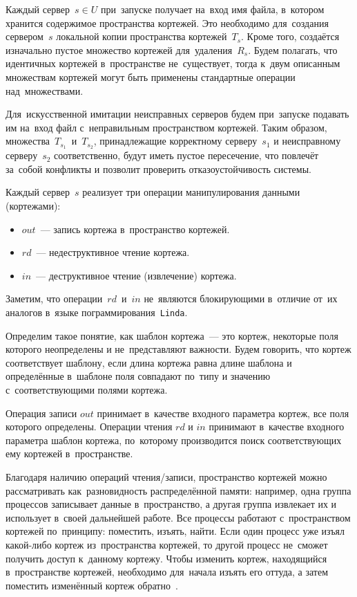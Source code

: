 Каждый сервер~$s \in U$ при~запуске получает на~вход имя файла, в~котором хранится содержимое пространства кортежей. Это необходимо для~создания сервером~$s$ локальной копии пространства кортежей~$T_s$. Кроме того, создаётся изначально пустое множество кортежей для~удаления~$R_s$. Будем полагать, что идентичных кортежей в~пространстве не~существует, тогда к~двум описанным множествам кортежей могут быть применены стандартные операции над~множествами.

Для~искусственной имитации неисправных серверов будем при~запуске подавать им на~вход файл с~неправильным пространством кортежей. Таким образом, множества~$T_{s_1}$~и~$T_{s_2}$, принадлежащие корректному серверу~$s_1$ и неисправному серверу~$s_2$ соответственно, будут иметь пустое пересечение, что повлечёт за~собой конфликты и позволит проверить отказоустойчивость системы.

Каждый сервер~$s$ реализует три операции манипулирования данными (кортежами):
\begin{itemize}
	\item $out$~--- запись кортежа в~пространство кортежей.
	\item $rd$~--- недеструктивное чтение кортежа.
	\item $in$~--- деструктивное чтение (извлечение) кортежа.
\end{itemize}
Заметим, что операции~$rd$~и~$in$ не~являются блокирующими в~отличие от~их аналогов в~языке пограммирования~\texttt{Linda}.

Определим такое понятие, как шаблон кортежа~--- это кортеж, некоторые поля которого неопределены и не~представляют важности. Будем говорить, что кортеж соответствует шаблону, если длина кортежа равна длине шаблона и определённые в~шаблоне поля совпадают по~типу и значению с~соответствующими полями кортежа.

Операция записи $out$ принимает в~качестве входного параметра кортеж, все поля которого определены. Операции чтения $rd$ и $in$ принимают в~качестве входного параметра шаблон кортежа, по~которому производится поиск соответствующих ему кортежей в~пространстве.

Благодаря наличию операций чтения/записи, пространство кортежей можно рассматривать как~разновидность распределённой памяти: например, одна группа процессов записывает данные в~пространство, а другая группа извлекает их и использует в~своей дальнейшей работе. Все процессы работают с~пространством кортежей по~принципу: поместить, изъять, найти. Если один процесс уже изъял какой-либо кортеж из~пространства кортежей, то другой процесс не~сможет получить доступ к~данному кортежу. Чтобы изменить кортеж, находящийся в~пространстве кортежей, необходимо для~начала изъять его оттуда, а затем поместить изменённый кортеж обратно~\autocite{Voevodin}.

